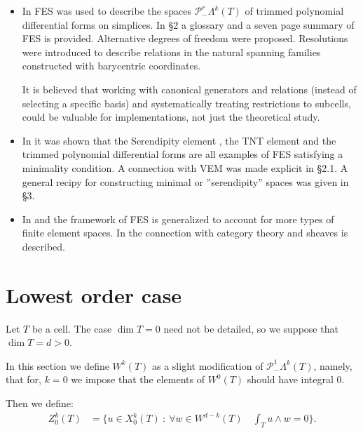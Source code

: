 \documentclass[10pt,a4paper]{article}
\newcommand{\calP}{\mathcal{P}}
\newcommand{\Poly}{\calP}
\newcommand{\Pminus}{\Poly_{\!\!-}}
\theoremstyle{remark}
\theoremstyle{definition}
\numberwithin{equation}{section}
\begin{document}
\begin{itemize}
\item In \cite{ChrRap16} FES was used to describe the spaces $\Pminus^r\Lambda^k(T)$ of trimmed polynomial differential forms on simplices. In \S 2  a glossary and a seven page summary of FES is provided. Alternative degrees of freedom were proposed. Resolutions were introduced to describe relations in the natural spanning families constructed with barycentric coordinates.

  It is believed that working with canonical generators and relations (instead of selecting a specific basis) and systematically treating restrictions to subcells, could be valuable for implementations, not just the theoretical study. 

\item In \cite{ChrGil16} it was shown that the Serendipity element \cite{ArnAwa14}, the TNT element \cite{CocQiu14} and the trimmed polynomial differential forms are all examples of FES satisfying a minimality condition. A connection with VEM was made explicit in \S 2.1. A general recipy for constructing minimal or ''serendipity'' spaces was given in \S 3.

\item In \cite{ChrHu18} and \cite{ChrHu23} the framework of FES is generalized to account for more types of finite element spaces. In \cite{ChrHu23,Chr22} the connection with category theory and sheaves is described.
\end{itemize}


\section{Lowest order case\label{sec:low}}
Let $T$ be a cell. The case $\dim T =0$ need not be detailed, so we suppose that $\dim T = d > 0$.

In this section we define $W^k(T)$ as a slight modification of $\Pminus^1 \Lambda^k(T)$, namely, that for, $k= 0$ we impose that the elements of $W^0(T)$ should have integral $0$.

Then we define:
\begin{align}
  Z^k_0(T) & = \{u \in X^k_0(T) \ : \ \forall w \in W^{d-k}(T) \quad \int_T u \wedge w = 0\}. %
\end{align}
\end{document}
